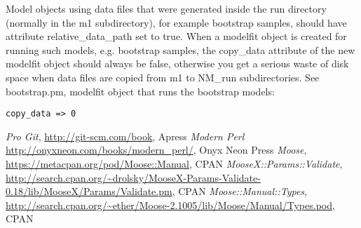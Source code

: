 Model objects using data files that were generated inside the run directory (normally in the m1 subdirectory),
for example bootstrap samples, should have attribute relative\_data\_path set to true.
When a modelfit object is created for running such models, e.g. bootstrap samples,
the copy\_data attribute of the new modelfit object should always be false, otherwise you get a serious waste of disk space
when data files are copied from m1 to NM\_run subdirectories.
See bootstrap.pm, modelfit object that runs the bootstrap models:
\begin{verbatim}
copy_data => 0
\end{verbatim}


\begin{thebibliography}{1}
	 {\em Pro Git}, \url{http://git-scm.com/book}, Apress
	 {\em Modern Perl} \url{http://onyxneon.com/books/modern_perl/}, Onyx Neon Press
	 {\em Moose}, \url{https://metacpan.org/pod/Moose::Manual}, CPAN
	 {\em MooseX::Params::Validate}, \url{http://search.cpan.org/\~drolsky/MooseX-Params-Validate-0.18/lib/MooseX/Params/Validate.pm}, CPAN
	 {\em Moose::Manual::Types}, \url{http://search.cpan.org/~ether/Moose-2.1005/lib/Moose/Manual/Types.pod}, CPAN
\end{thebibliography}



